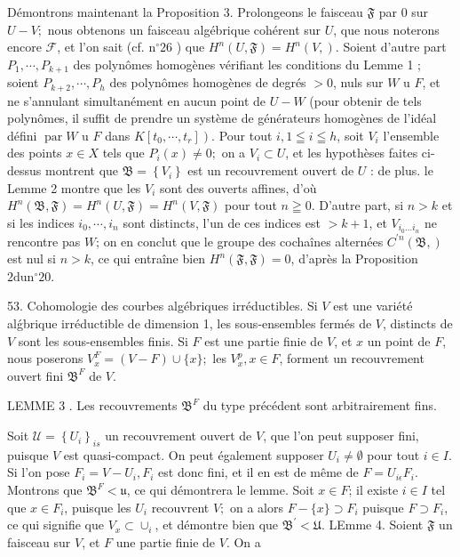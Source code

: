 Démontrons maintenant la Proposition 3. Prolongeons le faisceau $\mathfrak{F}$ par 0 sur $U-V ;$ nous obtenons un faisceau algébrique cohérent sur $U$, que nous noterons encore $\mathcal{F}$, et l'on sait (cf. $\mathrm{n}^{\circ} 26$ ) que $H^{n}(U, \mathfrak{F})=H^{n}(V, \mathfrak{}) .$ Soient d'autre part $P_{1}, \cdots, P_{k+1}$ des polynômes homogènes vérifiant les conditions du Lemme 1 ; soient $P_{k+2}, \cdots, P_{h}$ des polynômes homogènes de degrés $>0$, nuls sur $W$ u $F$, et ne s'annulant simultanément en aucun point de $U-W$ (pour obtenir de tels polynômes, il suffit de prendre un système de générateurs homogènes de l'idéal défini $\operatorname{par} W$ u $F$ dans $\left.K\left[t_{0}, \cdots, t_{r}\right]\right) .$ Pour tout $i, 1 \leqq i \leqq h$, soit $V_{i}$ l'ensemble des points $x \in X$ tels que $P_{i}(x) \neq 0 ;$ on a $V_{i} \subset U$, et les hypothèses faites ci-dessus montrent que $\mathfrak{B}=\left\{V_{i}\right\}$ est un recouvrement ouvert de $U$ : de plus. le Lemme 2 montre que les $V_{i}$ sont des ouverts affines, d'où $H^{n}(\mathfrak{B}, \mathfrak{F})=H^{n}(U, \mathfrak{F})=H^{n}(V, \mathfrak{F})$ pour tout $n \geqq 0 .$ D'autre part, si $n>k$ et si les indices $i_{0}, \cdots, i_{n}$ sont distincts, l'un de ces indices est $>k+1$, et $V_{i_{0} \ldots i_{n}}$ ne rencontre pas $W$; on en conclut que le groupe des cochaînes alternées $C^{\prime n}(\mathfrak{B}, \mathfrak{})$ est nul si $n>k$, ce qui entraîne bien $H^{n}(\mathfrak{F}, \mathfrak{F})=0$, d'après la Proposition $2 \mathrm{du} \mathrm{n}^{\circ} 20$.

53. Cohomologie des courbes algébriques irréductibles. Si $V$ est une variété alǵbrique irréductible de dimension 1, les sous-ensembles fermés de $V$, distincts de $V$ sont les sous-ensembles finis. Si $F$ est une partie finie de $V$, et $x$ un point de $F$, nous poserons $V_{x}^{F}=(V-F) \cup\{x\} ;$ les $V_{x}^{p}, x \in F$, forment un recouvrement ouvert fini $\mathfrak{B}^{F}$ de $V$.

LEMME 3 . Les recouvrements $\mathfrak{B}^{F}$ du type précédent sont arbitrairement fins.

Soit $\mathcal{U}=\left\{U_{i}\right\}_{i s}$ un recouvrement ouvert de $V$, que l'on peut supposer fini, puisque $V$ est quasi-compact. On peut également supposer $U_{i} \neq \emptyset$ pour tout $i \in I$. Si l'on pose $F_{i}=V-U_{i}, F_{i}$ est donc fini, et il en est de même de $F=U_{i \epsilon} F_{i} .$ Montrons que $\mathfrak{B}^{F}<\mathfrak{u}$, ce qui démontrera le lemme. Soit $x \in F$; il existe $i \in I$ tel que $x \in F_{i}$, puisque les $U_{i}$ recouvrent $V ;$ on a alors $F-\{x\} \supset F_{i}$ puisque $F \supset F_{i}$, ce qui signifie que $V_{x} \subset \cup_{i}$, et démontre bien que $\mathfrak{B}^{\prime}<\mathfrak{U} .$ LEmme 4. Soient $\mathfrak{F}$ un faisceau sur $V$, et $F$ une partie finie de $V$. On a

